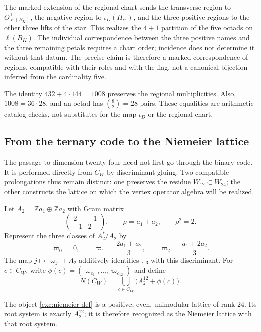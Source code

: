 The marked extension of the regional chart sends the transverse region
to $O_{\ell(B_K)}^\perp$, the negative region to $\iota_D(H^-_\alpha)$, and the
three positive regions to the other three lifts of the star. This
realizes the $4+1$ partition of the five octads on $\ell(B_K)$.
The individual correspondence between the three positive names and
the three remaining petals requires a chart order; incidence does not
determine it without that datum. The precise claim is therefore a
marked correspondence of regions, compatible with their roles and with
the flag, not a canonical bijection inferred from the cardinality five.

The identity $432+4\cdot144=1008$ preserves the regional
multiplicities. Also, $1008=36\cdot28$, and an octad has
$\binom82=28$ pairs. These equalities are arithmetic catalog
checks, not substitutes for the map $\iota_D$ or the regional chart.

\subsection{From the ternary code to the Niemeier lattice}
\label{exc:niemeier}

The passage to dimension twenty-four need not first go through the
binary code. It is performed directly from $C_W$ by discriminant
gluing. Two compatible prolongations thus remain distinct:
one preserves the residue $W_{12}\subset W_{24}$; the other constructs the
lattice on which the vertex operator algebra will be realized.

Let $A_2=\mathbb Z a_1\oplus\mathbb Z a_2$ with Gram matrix
\[
 \begin{pmatrix}2&-1\\-1&2\end{pmatrix},
 \qquad \rho=a_1+a_2,\qquad \rho^2=2.
\]
Represent the three classes of $A_2^*/A_2$ by
\[
 \varpi_0=0,\qquad
 \varpi_1=\frac{2a_1+a_2}{3},\qquad
 \varpi_2=\frac{a_1+2a_2}{3}.
\]
The map $j\mapsto\varpi_j+A_2$ additively identifies
$\mathbb F_3$ with this discriminant. For $c\in C_W$, write
$\phi(c)=(\varpi_{c_1},\ldots,\varpi_{c_{12}})$ and define
\begin{equation}
 N(C_W)=\bigcup_{c\in C_W}\bigl(A_2^{12}+\phi(c)\bigr).
 \label{exc:niemeier-def}
\end{equation}

\begin{theorem}
\label{exc:niemeier-teorema}
The object \eqref{exc:niemeier-def} is a positive, even,
unimodular lattice of rank $24$. Its root system is exactly
$A_2^{12}$; it is therefore recognized as the Niemeier lattice with
that root system.
\end{theorem}

